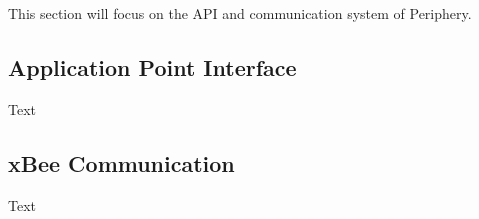 
This section will focus on the API and communication system of Periphery.

\subsection{Application Point Interface} 

Text

\subsection{xBee Communication}

Text
